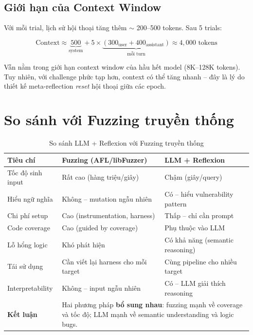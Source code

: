 \documentclass{nt521report}
\begin{document}
\subsection{Giới hạn của Context Window}

Với mỗi trial, lịch sử hội thoại tăng thêm $\sim$ 200--500 tokens. Sau 5 trials:

\begin{equation}
  \text{Context} \approx \underbrace{500}_{\text{system}} + 5 \times \underbrace{(300_{\text{user}} + 400_{\text{assistant}})}_{\text{mỗi turn}} \approx 4{,}000 \text{ tokens}
\end{equation}

Vẫn nằm trong giới hạn context window của hầu hết model (8K--128K tokens). Tuy nhiên, với challenge phức tạp hơn, context có thể tăng nhanh -- đây là lý do thiết kế meta-reflection \textit{reset} hội thoại giữa các epoch.

\section{So sánh với Fuzzing truyền thống}
\label{sec:compare-fuzzing}

\begin{table}[H]
  \centering
  \caption{So sánh LLM + Reflexion với Fuzzing truyền thống}
  \label{tab:compare-fuzzing}
  \begin{tabularx}{\textwidth}{l X X}
    \toprule
    \textbf{Tiêu chí} & \textbf{Fuzzing (AFL/libFuzzer)} & \textbf{LLM + Reflexion} \\
    \midrule
    Tốc độ sinh input & Rất cao (hàng triệu/giây) \cite{zalewski2014afl} & Chậm (giây/query) \\
    Hiểu ngữ nghĩa & Không -- mutation ngẫu nhiên & Có -- hiểu vulnerability pattern \\
    Chi phí setup & Cao (instrumentation, harness) & Thấp -- chỉ cần prompt \\
    Code coverage & Cao (guided by coverage) \cite{bohme2017directed} & Phụ thuộc vào LLM \\
    Lỗ hổng logic & Khó phát hiện & Có khả năng (semantic reasoning) \\
    Tái sử dụng & Cần viết lại harness cho mỗi target & Cùng pipeline cho nhiều target \\
    Interpretability & Không -- input ngẫu nhiên & Có -- LLM giải thích reasoning \\
    \midrule
    \textbf{Kết luận} & \multicolumn{2}{X}{Hai phương pháp \textbf{bổ sung nhau}: fuzzing mạnh về coverage và tốc độ; LLM mạnh về semantic understanding và logic bugs.} \\
    \bottomrule
  \end{tabularx}
\end{table}
\end{document}
